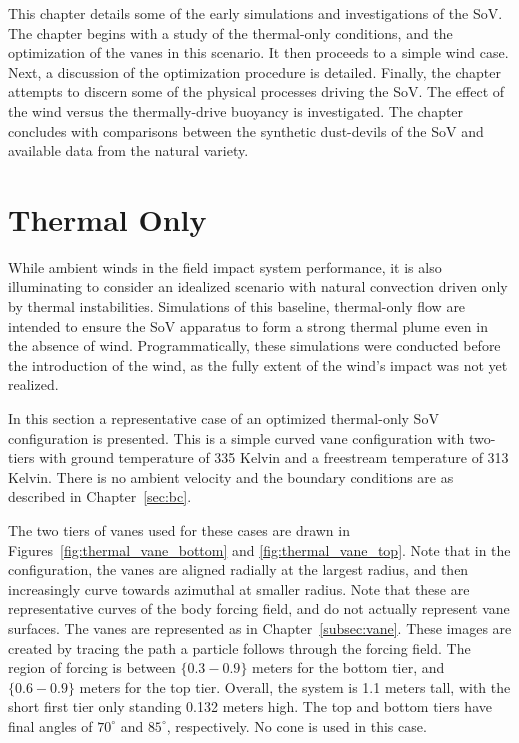 \label{sec:results}

%
%
%
%

This chapter details some of the early simulations and investigations
of the SoV. The chapter begins with a study of the thermal-only
conditions, and the optimization of the vanes in this scenario. It then
proceeds to a simple wind case. Next, a discussion of the optimization
procedure is detailed. Finally, the chapter attempts to discern some of
the physical processes driving the SoV. The effect of the wind versus
the thermally-drive buoyancy is investigated. The chapter concludes with
comparisons between the synthetic dust-devils of the SoV and available
data from the natural variety. 

\section{Thermal Only}
\label{sec:thermal_only}

While ambient winds in the field impact system performance, it is
also illuminating to consider an idealized scenario with natural
convection driven only by thermal instabilities. Simulations of this
baseline, thermal-only flow are intended to ensure the SoV apparatus to
form a strong thermal plume even in the absence of
wind. Programmatically, these simulations were conducted before the
introduction of the wind, as the fully extent of the wind's impact was
not yet realized. 

In this section a representative case of an optimized thermal-only SoV
configuration is presented. This is a simple curved vane configuration with
two-tiers with ground temperature of 335 Kelvin and a freestream
temperature of 313 Kelvin. There is no ambient velocity and the boundary
conditions are as described in Chapter~\ref{sec:bc}.  

The two tiers of vanes used for these cases are drawn in~
Figures~\ref{fig:thermal_vane_bottom} and \ref{fig:thermal_vane_top}.  
Note that in the configuration, the vanes are aligned radially at the
largest radius, and then increasingly curve towards azimuthal at smaller
radius. Note that these are representative curves of the body forcing
field, and do not actually represent vane surfaces. The vanes are
represented as in Chapter~\ref{subsec:vane}.  These images are created
by tracing the path a particle follows through the forcing field. The
region of forcing is between $\{0.3-0.9\}$ meters for the bottom tier,
and $\{0.6-0.9\}$ meters for the top tier. Overall, the system is 1.1
meters tall, with the short first tier only standing 0.132 meters
high. The top and bottom tiers have final angles of $70^{\circ}$ and
$85^{\circ}$, respectively. No cone is used in this case. 

